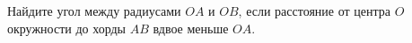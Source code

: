 \begin{ex}
	\begin{condition}
		Найдите угол между радиусами \( OA  \) и \( OB \), если расстояние от центра \( O  \) окружности до хорды \( AB \) вдвое меньше \( OA \).
	\end{condition}
\end{ex}